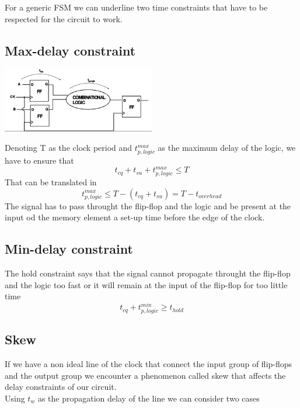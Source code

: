 For a generic FSM we can underline two time constraints that have to be respected for the circuit to work.\\

\subsection{Max-delay constraint}

\centering
\includegraphics[width=0.5\textwidth]{C10_6.png}\\
\raggedright

Denoting T as the clock period and $t_{p,logic}^{max}$ as the maximum delay of the logic, we have to ensure that 
\begin{equation}
t_{cq}+t_{su}+ t_{p,logic}^{max} \le T
\end{equation}
That can be translated in 
\begin{equation}
t_{p,logic}^{max}\le T-(t_{cq}+t_{su})=T-t_{overhead}
\end{equation}
The signal has to pass throught the flip-flop and the logic and be present at the input od the memory element a set-up time before the edge of the clock.\\

\subsection{Min-delay constraint}
The hold constraint says that the signal cannot propagate throught the flip-flop and the logic too fast or it will remain at the input of the flip-flop for too little time
\begin{equation}
t_{cq}+ t_{p,logic}^{min} \ge t_{hold}
\end{equation}

\subsection{Skew}
If we have a non ideal line of the clock that connect the input group of flip-flops and the output group we encounter a phenomenon called skew that affects the delay constraints of our circuit.\\
Using $t_w$ as the propagation delay of the line we can consider two cases

